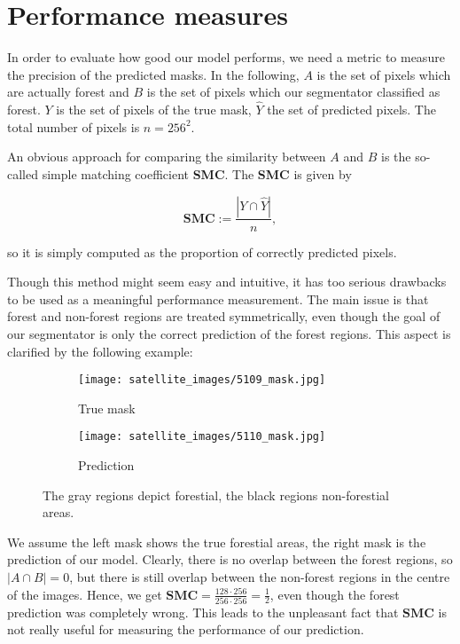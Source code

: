 \section{Performance measures}
In order to evaluate how good our model performs, we need a metric to measure the precision of the predicted masks.
In the following, $A$ is the set of pixels which are actually forest and $B$ is the set of pixels which our segmentator classified as forest. $Y$ is the set of pixels of the true mask, $\hat{Y}$ the set of predicted pixels. The total number of pixels is $n=256^2$.

An obvious approach for comparing the similarity between $A$ and $B$ is the so-called simple matching coefficient \textbf{SMC}. The \textbf{SMC} is given by

\begin{equation}
	\textbf{SMC}:=\frac{|Y\cap \hat{Y}|}{n},
\end{equation}

so it is simply computed as the proportion of correctly predicted pixels.

Though this method might seem easy and intuitive, it has too serious drawbacks to be used as a meaningful performance measurement. The main issue is that forest and non-forest regions are treated symmetrically, even though the goal of our segmentator is only the correct prediction of the forest regions. This aspect is clarified by the following example:

\begin{figure}[h]
	\centering
	\begin{subfigure}{.5\textwidth}
		\centering
		\texttt{[image: satellite\_images/5109\_mask.jpg]}
		\caption{True mask}
		\label{fig:sub1}
	\end{subfigure}%
	\begin{subfigure}{.5\textwidth}
		\centering
		\texttt{[image: satellite\_images/5110\_mask.jpg]}
		\caption{Prediction}
		\label{fig:sub2}
	\end{subfigure}
	\caption{The gray regions depict forestial, the black regions non-forestial areas. }
	\label{fig:test}
\end{figure}

We assume the left mask shows the true forestial areas, the right mask is the prediction of our model. Clearly, there is no overlap between the forest regions, so $|A \cap B| = 0$, but there is still overlap between the non-forest regions in the centre of the images. Hence, we get $\textbf{SMC}=\frac{128\cdot 256}{256 \cdot 256}=\frac{1}{2}$, even though the forest prediction was completely wrong. This leads to the unpleasant fact that $\textbf{SMC}$ is not really useful for measuring the performance of our prediction.

